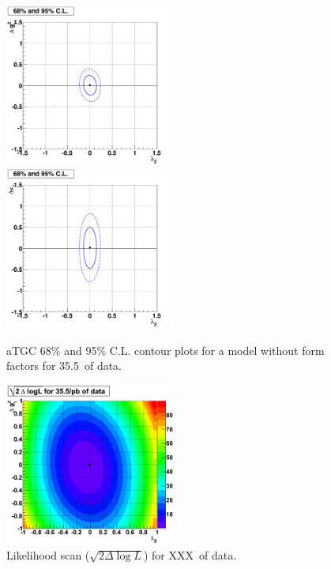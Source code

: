 \begin{figure}[tp]
  \centerline{
    \includegraphics[width=0.5\textwidth]{figures/lz_dkz_contourplot2}
    \includegraphics[width=0.5\textwidth]{figures/lz_dkg_contourplot2}
  }

  \caption[Contour plots for data] {aTGC 68\% and 95\% C.L. contour
    plots for a model without form factors for 35.5\ipb\ of data.}
  \label{fig:contour}
\end{figure}

\begin{figure}[tp]
  \centerline{
    \includegraphics[width=0.5\textwidth]{figures/lz_dkz_likelihood.png}
  }

  \caption[Likelihood scan] {Likelihood scan ($\sqrt{2\Delta\log L}$)
    for XXX\ipb\ of  data. }
  \label{ref:likelihood}
\end{figure}
